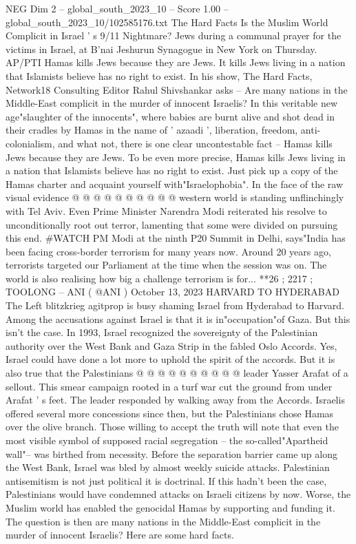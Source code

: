 \begin{textsample}{NEG Dim 2 – global\_south\_2023\_10 – Score 1.00 – global\_south\_2023\_10/102585176.txt}  \label{ex:f2_neg_278}
The Hard Facts Is the Muslim World Complicit in Israel ' s 9/11 Nightmare?
Jews during a communal prayer for the victims in Israel, at B'nai Jeshurun Synagogue in New York on Thursday.
AP/PTI Hamas kills Jews because they are Jews.
It kills Jews living in a nation that Islamists believe has no right to exist.
In his show, The Hard Facts, Network18 Consulting Editor Rahul Shivshankar asks -- Are many nations in the Middle-East complicit in the murder of innocent Israelis?
In this veritable new age"slaughter of the innocents", where babies are burnt alive and shot dead in their cradles by Hamas in the name of ' azaadi ', liberation, freedom, anti-colonialism, and what not, there is one clear uncontestable fact -- Hamas kills Jews because they are Jews.
To be even more precise, Hamas kills Jews living in a nation that Islamists believe has no right to exist.
Just pick up a copy of the Hamas charter and acquaint yourself with"Israelophobia".
In the face of the raw visual evidence @ @ @ @ @ @ @ @ @ @ western world is standing unflinchingly with Tel Aviv.
Even Prime Minister Narendra Modi reiterated his resolve to unconditionally root out terror, lamenting that some were divided on pursuing this end. \#WATCH PM Modi at the ninth P20 Summit in Delhi, says"India has been facing cross-border terrorism for many years now.
Around 20 years ago, terrorists targeted our Parliament at the time when the session was on.
The world is also realising how big a challenge terrorism is for... **26 ; 2217 ; TOOLONG -- ANI ( @ANI ) October 13, 2023 HARVARD TO HYDERABAD The Left blitzkrieg agitprop is busy shaming Israel from Hyderabad to Harvard.
Among the accusations against Israel is that it is in"occupation"of Gaza.
But this isn't the case.
In 1993, Israel recognized the sovereignty of the Palestinian authority over the West Bank and Gaza Strip in the fabled Oslo Accords.
Yes, Israel could have done a lot more to uphold the spirit of the accords.
But it is also true that the Palestinians @ @ @ @ @ @ @ @ @ @ leader Yasser Arafat of a sellout.
This smear campaign rooted in a turf war cut the ground from under Arafat ' s feet.
The leader responded by walking away from the Accords.
Israelis offered several more concessions since then, but the Palestinians chose Hamas over the olive branch.
Those willing to accept the truth will note that even the most visible symbol of supposed racial segregation -- the so-called"Apartheid wall"-- was birthed from necessity.
Before the separation barrier came up along the West Bank, Israel was bled by almost weekly suicide attacks.
Palestinian antisemitism is not just political it is doctrinal.
If this hadn't been the case, Palestinians would have condemned attacks on Israeli citizens by now.
Worse, the Muslim world has enabled the genocidal Hamas by supporting and funding it.
The question is then are many nations in the Middle-East complicit in the murder of innocent Israelis?
Here are some hard facts.

\end{textsample}
